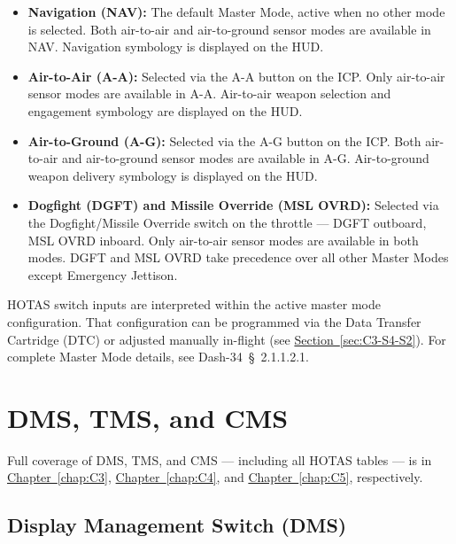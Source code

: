\documentclass[11pt, a4paper, twoside]{report}
\newcommand{\dashref}[1]{Dash-34~\S~#1}
\newcommand{\secref}[1]{\hyperref[#1]{Section~\ref*{#1}}}
\newcommand{\chapref}[1]{\hyperref[#1]{Chapter~\ref*{#1}}}
\begin{document}
\begin{itemize}

	\item \textbf{Navigation (NAV):} The default Master Mode, active when no other mode is selected. Both air-to-air and air-to-ground sensor modes are available in NAV. Navigation symbology is displayed on the HUD.
    \item \textbf{Air-to-Air (A-A):} Selected via the A-A button on the ICP. Only air-to-air sensor modes are available in A-A. Air-to-air weapon selection and engagement symbology are displayed on the HUD.
    \item \textbf{Air-to-Ground (A-G):} Selected via the A-G button on the ICP. Both air-to-air and air-to-ground sensor modes are available in A-G. Air-to-ground weapon delivery symbology is displayed on the HUD.
    \item \textbf{Dogfight (DGFT) and Missile Override (MSL OVRD):} Selected via the Dogfight/Missile Override switch on the throttle — DGFT outboard, MSL OVRD inboard. Only air-to-air sensor modes are available in both modes. DGFT and MSL OVRD take precedence over all other Master Modes except Emergency Jettison.

\end{itemize}

HOTAS switch inputs are interpreted within the active master mode configuration. That configuration can be programmed via the Data Transfer Cartridge (DTC) or adjusted manually in-flight (see \secref{sec:C3-S4-S2}). For complete Master Mode details, see \dashref{2.1.1.2.1}.

\section{DMS, TMS, and CMS}
\label{sec:C2-S3}

Full coverage of DMS, TMS, and CMS — including all HOTAS tables — is in \chapref{chap:C3}, \chapref{chap:C4}, and \chapref{chap:C5}, respectively.

\subsection{Display Management Switch (DMS)}
\label{sec:C2-S3-S1}
\end{document}
